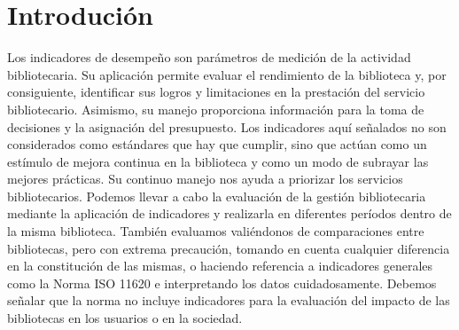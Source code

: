 \section{Introdución} 
\vspace{12mm} %


Los indicadores de desempeño son parámetros de medición de la actividad bibliotecaria. Su aplicación permite evaluar el rendimiento de la biblioteca y, por consiguiente, identificar sus logros y limitaciones en la prestación del servicio bibliotecario. Asimismo, su manejo proporciona información para la toma de decisiones y la asignación del presupuesto.
Los indicadores aquí señalados no son considerados como estándares que hay que cumplir, sino que actúan como un estímulo de mejora continua en la biblioteca y como un modo de subrayar las mejores prácticas. Su continuo manejo nos ayuda a priorizar los servicios bibliotecarios.
Podemos llevar a cabo la evaluación de la gestión bibliotecaria mediante la aplicación de indicadores y realizarla en diferentes períodos dentro de la misma biblioteca. También evaluamos valiéndonos de comparaciones entre bibliotecas, pero con extrema precaución, tomando en cuenta cualquier diferencia en la constitución de las mismas, o haciendo referencia a indicadores generales como la Norma ISO 11620 e interpretando los datos cuidadosamente. Debemos señalar que la norma no incluye indicadores para la evaluación del impacto de las bibliotecas en los usuarios o en la sociedad.



		

